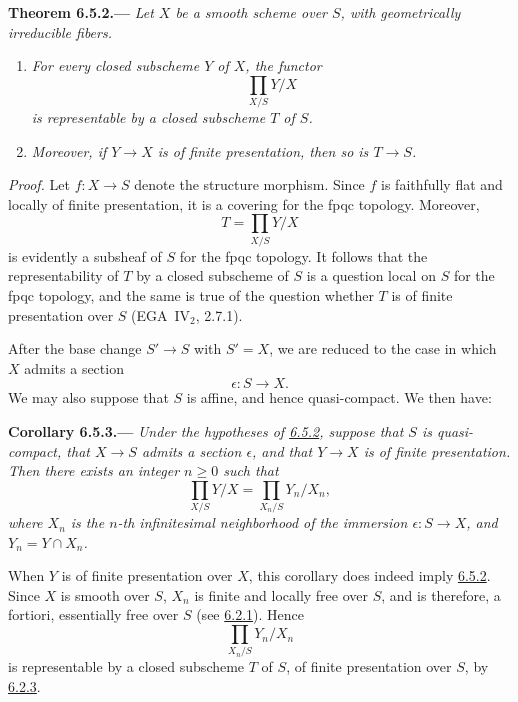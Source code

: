 
\medskip
{}\label{thm:sga3-VIB-6.5.2}%
\noindent\textbf{Theorem 6.5.2.---}
\emph{Let \(X\) be a smooth scheme over \(S\), with geometrically
irreducible fibers.}%
\begin{enumerate}
\item[\textup{(i)}]\label{concl:sga3-VIB-6.5.2-i}
  \emph{For every closed subscheme \(Y\) of \(X\), the functor
  \[
    \prod_{X/S}Y/X
  \]
  is representable by a closed subscheme \(T\) of \(S\).}
\item[\textup{(ii)}]\label{concl:sga3-VIB-6.5.2-ii}
  \emph{Moreover, if \(Y\to X\) is of finite presentation, then
  so is \(T\to S\).}
\end{enumerate}

\emph{Proof.}
Let \(f:X\to S\) denote the structure morphism. Since \(f\) is
faithfully flat and locally of finite
presentation, it is a covering for the fpqc topology. Moreover,
\[
  T=\prod_{X/S}Y/X
\]
is evidently a subsheaf of \(S\) for the fpqc topology. It follows
that the representability of \(T\) by a closed subscheme of \(S\)
is a question local on \(S\) for the fpqc topology,%
and the same is true of the question whether \(T\) is of finite
presentation over \(S\) (EGA~IV\(_2\), 2.7.1).

After the base change \(S'\to S\) with \(S'=X\), we are reduced
to the case in which \(X\) admits a section
\[
  \epsilon:S\longrightarrow X.
\]
We may also suppose that \(S\) is affine, and hence
quasi-compact. We then have:

\medskip
{}\label{cor:sga3-VIB-6.5.3}%
\noindent\textbf{Corollary 6.5.3.---}
\emph{Under the hypotheses of
\hyperref[thm:sga3-VIB-6.5.2]{6.5.2}, suppose that \(S\) is
quasi-compact, that \(X\to S\) admits a section \(\epsilon\), and
that \(Y\to X\) is of finite presentation. Then there exists an
integer \(n\geq0\) such that}
\label{eq:sga3-VIB-6.5.3-infinitesimal}%
\[
  \prod_{X/S}Y/X
  =
  \prod_{X_n/S}Y_n/X_n,
\]
\emph{where \(X_n\) is the \(n\)-th infinitesimal neighborhood of
the immersion \(\epsilon:S\to X\), and
\(Y_n=Y\cap X_n\).}

When \(Y\) is of finite presentation over \(X\), this corollary
does indeed imply
\hyperref[thm:sga3-VIB-6.5.2]{6.5.2}. Since \(X\) is smooth over
\(S\), \(X_n\) is finite and locally free over \(S\), and is
therefore, a fortiori, essentially free over \(S\)
(see \hyperref[def:sga3-VIB-6.2.1]{6.2.1}). Hence
\[
  \prod_{X_n/S}Y_n/X_n
\]
is representable by a closed subscheme \(T\) of \(S\), of finite
presentation over \(S\), by
\hyperref[thm:sga3-VIB-6.2.3]{6.2.3}.

